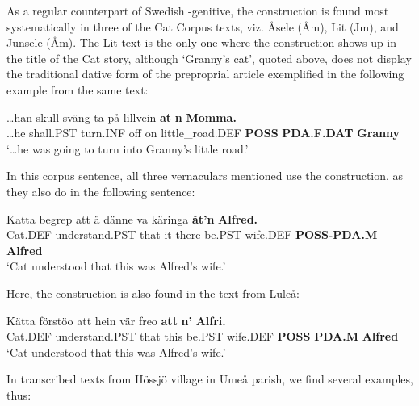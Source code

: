As a regular counterpart of Swedish -genitive, the  construction is\textit{ }found most systematically in three of the Cat Corpus texts, viz. Åsele (Åm), Lit (Jm), and Junsele (Åm). The Lit text is the only one where the  construction shows up in the title of the Cat story, although ‘Granny’s cat’, quoted above, does not display the traditional dative form  of the preproprial article exemplified in the following example from the same text:

\ea\label{}
\gll …han  skull  sväng  ta  på  lillvein  \textbf{at} \textbf{n} \textbf{Momma.}\\
…he  shall.PST  turn.INF  off  on  little\_road.DEF  \textbf{POSS} \textbf{PDA.F.DAT} \textbf{Granny}\\
\glt ‘…he was going to turn into Granny’s little road.’
\z

In this corpus sentence, all three vernaculars mentioned use the  construction, as they also do in the following sentence:

\ea\label{}
\gll Katta  begrep  att  ä  dänne  va  käringa  \textbf{åt’n} \textbf{Alfred.}\\
Cat.DEF  understand.PST  that  it  there  be.PST  wife.DEF  \textbf{POSS-PDA.M} \textbf{Alfred}\\
\glt ‘Cat understood that this was Alfred’s wife.’
\z

Here, the construction is also found in the text from Luleå:


\ea\label{}
\gll Kätta  förstöo  att  hein  vär  freo  \textbf{att} \textbf{n’} \textbf{Alfri.}\\
Cat.DEF  understand.PST  that  this  be.PST  wife.DEF  \textbf{POSS} \textbf{PDA.M} \textbf{Alfred}\\
\glt ‘Cat understood that this was Alfred’s wife.’
\z

In transcribed texts from Hössjö village in Umeå parish, we find several examples, thus:

\ea\label{}

